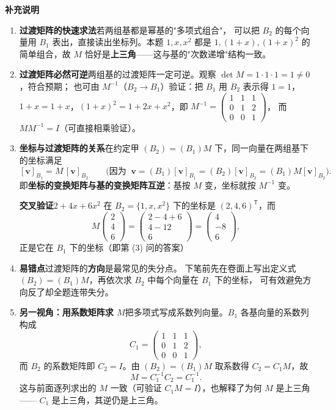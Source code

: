 \documentclass[10pt]{ctexart}
\newcommand{\TT}{^{\mathsf T}}
\newcommand{\bv}[1]{\begin{pmatrix}#1\end{pmatrix}}
\begin{document}
\begin{supbox}
\textbf{补充说明}

\begin{enumerate}
\item \textbf{过渡矩阵的快速求法}\quad 若两组基都是幂基的"多项式组合"，
可以把 $B_2$ 的每个向量用 $B_1$ 表出，直接读出坐标列。本题 $1,x,x^2$ 都是 $1,(1+x),(1+x)^2$ 的
简单组合，故 $M$ 恰好是\textbf{上三角}——这与基的"次数递增"结构一致。

\item \textbf{过渡矩阵必然可逆}\quad 两组基的过渡矩阵一定可逆。观察
$\det M=1\cdot1\cdot1=1\neq0$，符合预期；
也可由 $M^{-1}$（$B_2\to B_1$）验证：把 $B_1$ 用 $B_2$ 表示得
$1=1$，$1+x=1+x$，$(1+x)^2=1+2x+x^2$，即 $M^{-1}=\bv{1&1&1\\0&1&2\\0&0&1}$，
而 $M M^{-1}=I$（可直接相乘验证）。

\item \textbf{坐标与过渡矩阵的关系}\quad 在约定甲 $(B_2)=(B_1)M$ 下，同一向量在两组基下的坐标满足
\[
[\mathbf v]_{B_1}=M\,[\mathbf v]_{B_2}
\qquad\Big(\text{因为 }\ \mathbf v=(B_1)[\mathbf v]_{B_1}=(B_2)[\mathbf v]_{B_2}=(B_1)M[\mathbf v]_{B_2}\Big).
\]
即\textbf{坐标的变换矩阵与基的变换矩阵互逆}：基按 $M$ 变，坐标就按 $M^{-1}$ 变。

\textbf{交叉验证}\quad $2+4x+6x^2$ 在 $B_2=\{1,x,x^2\}$ 下的坐标是 $(2,4,6)\TT$，而
\[
M\bv{2\\4\\6}=\bv{2-4+6\\4-12\\6}=\bv{4\\-8\\6},
\]
正是它在 $B_1$ 下的坐标（即第 (3) 问的答案）\checkmark

\item \textbf{易错点}\quad 过渡矩阵的\textbf{方向}是最常见的失分点。
下笔前先在卷面上写出定义式 $(B_2)=(B_1)M$，再依次求 $B_2$ 中每个向量在 $B_1$ 下的坐标，
可有效避免方向反了却全题连带失分。

\item \textbf{另一视角：用系数矩阵求 $M$}\quad 把多项式写成系数列向量。$B_1$ 各基向量的系数列构成
\[
C_1=\bv{1&1&1\\0&1&2\\0&0&1},
\]
而 $B_2$ 的系数矩阵即 $C_2=I$。由 $(B_2)=(B_1)M$ 取系数得 $C_2=C_1M$，故
\[
M=C_1^{-1}C_2=C_1^{-1}.
\]
这与前面逐列求出的 $M$ 一致（可验证 $C_1M=I$），也解释了为何 $M$ 是上三角——
$C_1$ 是上三角，其逆仍是上三角。
\end{enumerate}
\end{supbox}
\end{document}
